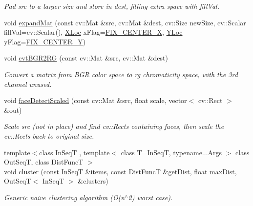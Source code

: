 \begin{DoxyCompactItemize}
\begin{DoxyCompactList}\small\item\em Pad {\ttfamily src} to a larger size and store in {\ttfamily dest}, filling extra space with {\ttfamily fill\-Val}. \end{DoxyCompactList}\item 
void \hyperlink{namespacecvutils_a128502dc926237b41ee2598574a4b409}{expand\-Mat} (const cv\-::\-Mat \&src, cv\-::\-Mat \&dest, cv\-::\-Size new\-Size, cv\-::\-Scalar fill\-Val=cv\-::\-Scalar(), \hyperlink{namespacecvutils_a955c1d8733f727414da8a357b938ced7}{X\-Loc} x\-Flag=\hyperlink{namespacecvutils_a955c1d8733f727414da8a357b938ced7a6a9a0a917be940c0641d145580dcf0f7}{F\-I\-X\-\_\-\-C\-E\-N\-T\-E\-R\-\_\-\-X}, \hyperlink{namespacecvutils_a0a32f5be1c20397001a2cdc59bacec81}{Y\-Loc} y\-Flag=\hyperlink{namespacecvutils_a0a32f5be1c20397001a2cdc59bacec81ad6382055c3ad3cb882f8f123e3b64f38}{F\-I\-X\-\_\-\-C\-E\-N\-T\-E\-R\-\_\-\-Y})
\item 
void \hyperlink{namespacecvutils_afce5aa1e29332624c3f7cbabcbe19f69}{cvt\-B\-G\-R2\-R\-G} (const cv\-::\-Mat \&src, cv\-::\-Mat \&dest)
\begin{DoxyCompactList}\small\item\em Convert a matrix from B\-G\-R color space to rg chromaticity space, with the 3rd channel unused. \end{DoxyCompactList}\item 
void \hyperlink{namespacecvutils_aa787df79b1daecd591a52fd071ac5618}{face\-Detect\-Scaled} (const cv\-::\-Mat \&src, float scale, vector$<$ cv\-::\-Rect $>$ \&out)
\begin{DoxyCompactList}\small\item\em Scale {\ttfamily src} (not in place) and find {\ttfamily cv\-::\-Rect}s containing faces, then scale the {\ttfamily cv\-::\-Rect}s back to original size. \end{DoxyCompactList}\item 
{\footnotesize template$<$class In\-Seq\-T , template$<$ class T=\-In\-Seq\-T, typename...\-Args $>$ class Out\-Seq\-T, class Dist\-Func\-T $>$ }\\void \hyperlink{namespacecvutils_acbbf9e8cbd6decade9a79781d981d085}{cluster} (const In\-Seq\-T \&items, const Dist\-Func\-T \&get\-Dist, float max\-Dist, Out\-Seq\-T$<$ In\-Seq\-T $>$ \&clusters)
\begin{DoxyCompactList}\small\item\em Generic naive clustering algorithm ({\ttfamily O(n$^\wedge$2)} worst case). \end{DoxyCompactList}\item 

\end{DoxyCompactItemize}

